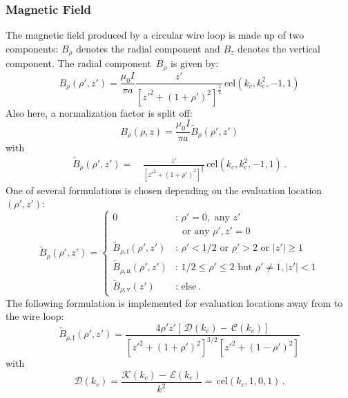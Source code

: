 \subsubsection{Magnetic Field}
The magnetic field produced by a circular wire loop is made up of two components:
$B_\rho$ denotes the radial component and $B_z$ denotes the vertical component.
The radial component~$B_\rho$ is given by:
\begin{equation}
  B_\rho(\rho', z')
  = \frac{\mu_0 I}{\pi a} \frac{z'}{\left[ z'^2 + (1 + \rho')^2 \right]^{\frac{3}{2}}} \,\mathrm{cel}(k_c, k_c^2, -1, 1)
\end{equation}
Also here, a normalization factor is split off:
\begin{equation}
  B_\rho(\rho, z) = \frac{\mu_0 I}{\pi a} \tilde{B}_\rho(\rho', z')
\end{equation}
with
\begin{align}
  \tilde{B}_\rho(\rho', z')
  =&\, \frac{z'}{\left[ z'^2 + (1 + \rho')^2 \right]^{\frac{3}{2}}} \,\mathrm{cel}(k_c, k_c^2, -1, 1) \, .
\end{align}
One of several formulations is chosen depending on the evaluation location~$(\rho', z')$:
\begin{equation}
  \tilde{B}_\rho(\rho', z')
  = \begin{cases}
      0                                 &:\, \rho' = 0, \textrm{ any } z' \\
                    ~                   &\, ~\textrm{ or any } \rho', z' = 0 \\
      \tilde{B}_{\rho,\mathrm{f}} (\rho', z') &:\, \rho' < 1/2 \textrm{ or } \rho' > 2 \textrm{ or } |z'| \geq 1 \\
      \tilde{B}_{\rho,\mathrm{n}} (\rho', z') &:\, 1/2 \leq \rho' \leq 2 \textrm{ but } \rho' \neq 1, |z'| < 1 \\
      \tilde{B}_{\rho,\mathrm{v}} (z')        &:\, \textrm{else} \, .
    \end{cases}
\end{equation}
The following formulation is implemented for evaluation locations away from to the wire loop:
\begin{equation}
  \tilde{B}_{\rho,\mathrm{f}} (\rho', z')
  = \frac{4 \rho' z' \left[ \,\mathcal{D}(k_c) - \,\mathcal{C}(k_c) \right]}
         {\left[{z'}^2 + (1 + \rho')^2 \right]^{3/2} \left[{z'}^2 + (1 - \rho')^2 \right] } \label{eqn:cwl_B_rho_f}
\end{equation}
with
\begin{equation}
  \mathcal{D}(k_c)
  = \frac{\mathcal{K}(k_c) - \,\mathcal{E}(k_c)}{k^2}
  = \,\mathrm{cel}(k_c, 1, 0, 1) \, . \label{eqn:elliptic_d}
\end{equation}
